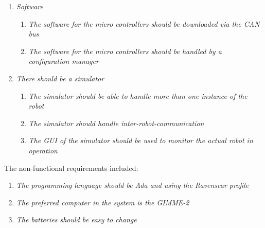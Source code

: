 \begin{enumerate}
   \item { \em Software} 
   \begin{enumerate}
   		\item { \em The software for the micro controllers should be downloaded via the CAN bus} 
   		\item { \em The software for the micro controllers should be handled by a configuration manager}	
   \end{enumerate}
   \item { \em There should be a simulator} 
      \begin{enumerate}
   		\item { \em The simulator should be able to handle more than one instance
			of the robot} 
   		\item { \em The simulator should handle inter-robot-communication} 
		\item { \em The GUI of the simulator should be used to monitor the actual
				robot in operation} 		
   \end{enumerate}
\end{enumerate}

The non-functional requirements included:
\begin{enumerate}
   \item { \em The programming language should be Ada and using the Ravenscar profile} 
   \item { \em The preferred computer in the system is the GIMME-2} 
   \item { \em The batteries should be easy to change} 
\end{enumerate}
